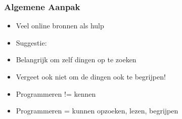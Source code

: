 \begin{frame}
  \frametitle{Algemene Aanpak}
  \begin{itemize}
    \item Veel online bronnen als hulp
    \item Suggestie: 
    \item Belangrijk om zelf dingen op te zoeken
    \item Vergeet ook niet om de dingen ook te begrijpen!
    \item Programmeren != kennen
    \item Programmeren = kunnen opzoeken, lezen, begrijpen
  \end{itemize}
\end{frame}


